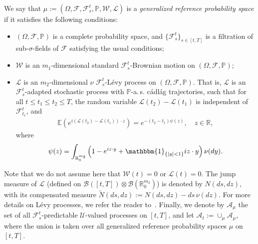 \documentclass[amscd,amssymb,11pt]{article}
\numberwithin{theorem}{section}
\numberwithin{equation}{section}
\begin{document}
We say that $\mu:=(\Omega,\mathscr{F},\mathscr{F}_{s}^{t},\mathbb{P},\mathcal{W},\mathcal{L})$ is a \emph{generalized reference probability space} if it satisfies the following conditions:
\begin{itemize}
\item $(\Omega,\mathscr{F},\mathbb{P})$ is a complete probability space, and $\{\mathscr{F}_{s}^t\}_{s\in [t,T]}$ is a filtration of sub-$\sigma$-fields of $\mathscr{F}$ satisfying the usual conditions;
\item $\mathcal{W}$ is an $m_{1}$-dimensional standard $\mathscr{F}_{s}^{t}$-Brownian motion on $(\Omega,\mathscr{F},\mathbb{P})$;
\item $\mathcal{L}$ is an $m_{2}$-dimensional $\nu$ $\mathscr{F}_{s}^{t}$-L\'{e}vy process on $(\Omega,\mathscr{F},\mathbb{P})$. That is, $\mathcal{L}$ is an $\mathcal{F}^{t}_{s}$-adapted stochastic process with $\mathbb{P}$-a.$\,$s. c\'{a}dl\'{a}g trajectories, such that for all $t\leq t_1\leq t_2\leq T$, the random variable $\mathcal{L}(t_{2})-\mathcal{L}(t_{1})$ is independent of $\mathscr{F}^{t}_{t_{1}}$, and
    \begin{align*}
    \mathbb{E}\left(e^{i\left(\mathcal{L}(t_{2})-\mathcal{L}(t_{1})\right)\cdot z}\right)=e^{-(t_{2}-t_{1})\psi(z)},\quad z\in\mathbb{R},
    \end{align*}
    where
    \begin{align*}
    \psi(z)=\int_{\mathbb{R}^{m_{2}}_{0}}\left(1-e^{iz\cdot y}+\mathbbm{1}_{\{|y|<1\}}iz\cdot y\right)\nu(dy).
    \end{align*}
\end{itemize}
Note that we do not assume here that $\mathcal{W}(t)=0$ or $\mathcal{L}(t)=0$. The jump measure of $\mathcal{L}$ (defined on $\mathcal{B}([t,T])\otimes\mathcal{B}(\mathbb{R}^{m_{2}}_{0})$) is denoted by $N(ds,dz)$, with its compensated measure $\widetilde{N}(ds,dz):=N(ds,dz)-ds\,\nu(dz)$. For more details on L\'{e}vy processes, we refer the reader to~\cite{Appelbaum:2009,Bertoin:1996,PeszatZabczyk:2007}. Finally, we denote by $\mathcal{A}_{\mu}$ the set of all $\mathscr{F}_s^t$-predictable $\mathcal{U}$-valued processes on $[t,T]$, and let $\mathcal{A}_{t}:=\cup_{\mu}\mathcal{A}_{\mu}$, where the union is taken over all generalized reference probability spaces $\mu$ on $[t,T]$.
\end{document}
